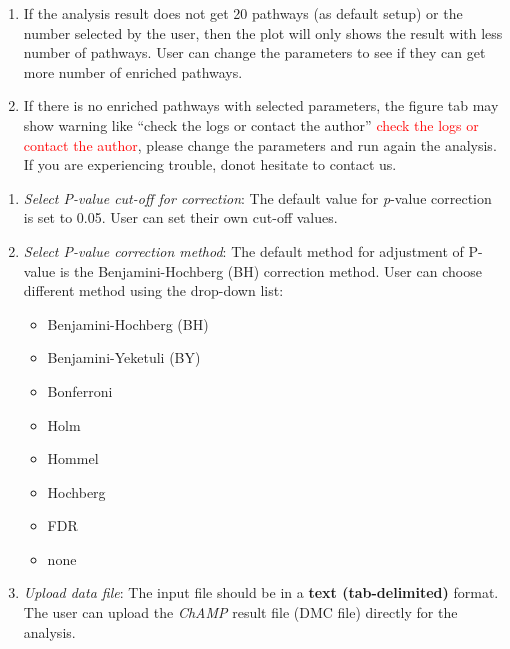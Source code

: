 \documentclass[
  a4paper,
  DIV=11,
  numbers=noendperiod,
  oneside,
  open=any]{scrreport}
\providecommand{\tightlist}{%
  \setlength{\itemsep}{0pt}\setlength{\parskip}{0pt}}\usepackage{longtable,booktabs,array}
\begin{document}
\begin{tcolorbox}[enhanced jigsaw, opacityback=0, toprule=.15mm, bottomtitle=1mm, colback=white, rightrule=.15mm, breakable, coltitle=black, colbacktitle=quarto-callout-tip-color!10!white, toptitle=1mm, arc=.35mm, colframe=quarto-callout-tip-color-frame, bottomrule=.15mm, opacitybacktitle=0.6, titlerule=0mm, leftrule=.75mm, title=\textcolor{quarto-callout-tip-color}{\faLightbulb}\hspace{0.5em}{Tip}, left=2mm]

\begin{enumerate}
\def\labelenumi{\arabic{enumi}.}
\tightlist
\item
  If the analysis result does not get 20 pathways (as default setup) or
  the number selected by the user, then the plot will only shows the
  result with less number of pathways. User can change the parameters to
  see if they can get more number of enriched pathways.
\item
  If there is no enriched pathways with selected parameters, the figure
  tab may show warning like {``check the logs or contact the author''}
  \textcolor{red}{check the logs or contact the author}, please change
  the parameters and run again the analysis. If you are experiencing
  trouble, donot hesitate to contact us.
\end{enumerate}

\end{tcolorbox}

\begin{enumerate}
\def\labelenumi{\arabic{enumi}.}
\setcounter{enumi}{3}
\item
  \emph{Select P-value cut-off for correction}: The default value for
  \emph{p}-value correction is set to 0.05. User can set their own
  cut-off values.
\item
  \emph{Select P-value correction method}: The default method for
  adjustment of P-value is the Benjamini-Hochberg (BH) correction
  method. User can choose different method using the drop-down list:

  \begin{itemize}
  \tightlist
  \item
    Benjamini-Hochberg (BH)
  \item
    Benjamini-Yeketuli (BY)
  \item
    Bonferroni
  \item
    Holm
  \item
    Hommel
  \item
    Hochberg
  \item
    FDR
  \item
    none
  \end{itemize}
\item
  \emph{Upload data file}: The input file should be in a \textbf{text
  (tab-delimited)} format. The user can upload the \emph{ChAMP} result
  file (DMC file) directly for the analysis.
\end{enumerate}
\end{document}
